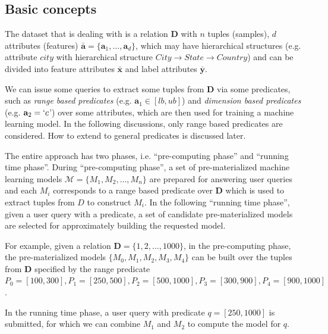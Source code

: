 \subsection{Basic concepts}
The dataset that \cite{hasani2018efficient} is dealing with is a relation $\textbf{D}$ with $n$ tuples (samples), $d$ attributes (features) $\bar{\textbf{a}} = \{\textbf{a}_1, \dots, \textbf{a}_d\}$, which may have hierarchical structures (e.g. attribute $city$ with hierarchical structure $City \rightarrow State \rightarrow Country$) and can be divided into feature attributes $\bar{\textbf{x}}$ and label attributes $\bar{\textbf{y}}$.

We can issue some queries to extract some tuples from $\textbf{D}$ via some predicates, such as {\em range based predicates} (e.g. $\textbf{a}_1 \in [lb, ub]$) and {\em dimension based predicates} (e.g. $\textbf{a}_2 = `c$') over some attributes, which are then used for training a machine learning model. In the following discussions, only range based predicates are considered. How to extend to general predicates is discussed later. 

The entire approach has two phases, i.e. ``pre-computing phase'' and ``running time phase''. During ``pre-computing phase'', a set of pre-materialized machine learning models $\mathcal{M} = \{M_1, M_2, \dots, M_n\}$ are prepared for answering user queries and each $M_i$ corresponds to a range based predicate over $\textbf{D}$ which is used to extract tuples from $D$ to construct $M_i$. In the following ``running time phase'', given a user query with a predicate, a set of candidate pre-materialized models are selected for approximately building the requested model.

\begin{example}\label{eg: two_phase_eg}
For example, given a relation $\textbf{D}=\{1,2,\dots, 1000\}$, in the pre-computing phase, the pre-materialized models $\{M_0, M_1, M_2, M_3, M_4\}$ can be built over the tuples from $\textbf{D}$ specified by the range predicate $P_0 = [100, 300], P_1 = [250, 500], P_2 = [500, 1000], P_3 = [300, 900], P_4 = [900, 1000]$. 

In the running time phase, a user query with predicate $q=[250, 1000]$ is submitted, for which we can combine $M_1$ and $M_2$ to compute the model for $q$.
\end{example}

